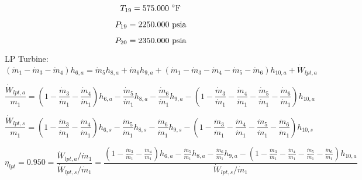 \documentclass{article}
\begin{document}
\begin{equation}
T_{19} =  575.000\textnormal{ \(^{\circ}\)F             }
\end{equation}

\begin{equation}
P_{19} = 2250.000\textnormal{ psia                      }
\end{equation}

\begin{equation}
P_{20} = 2350.000\textnormal{ psia                      }
\end{equation}


LP Turbine:
\begin{equation}
(\dot{m}_{ 1} - \dot{m}_{ 3} - \dot{m}_{ 4})h_{ 6,a} = \dot{m}_{ 5}h_{ 8,a} + \dot{m}_{ 6}h_{ 9,a} + (\dot{m}_{ 1} - \dot{m}_{ 3} - \dot{m}_{ 4} - \dot{m}_{ 5} - \dot{m}_{ 6})h_{10,a} + \dot{W}_{lpt,a}
\end{equation}

\begin{equation}
\frac{\dot{W}_{lpt,a}}{m_1} = (1 - \frac{\dot{m}_{ 3}}{\dot{m}_{ 1}} - \frac{\dot{m}_{ 4}}{\dot{m}_{ 1}})h_{ 6,a} - \frac{\dot{m}_{ 5}}{\dot{m}_{ 1}}h_{ 8,a} - \frac{\dot{m}_{ 6}}{\dot{m}_{ 1}}h_{ 9,a} - (1 - \frac{\dot{m}_{ 3}}{\dot{m}_{ 1}} - \frac{\dot{m}_{ 4}}{\dot{m}_{ 1}} - \frac{\dot{m}_{ 5}}{\dot{m}_{ 1}} - \frac{\dot{m}_{ 6}}{\dot{m}_{ 1}})h_{10,a}\end{equation}

\begin{equation}
\frac{\dot{W}_{lpt,s}}{m_1} = (1 - \frac{\dot{m}_{ 3}}{\dot{m}_{ 1}} - \frac{\dot{m}_{ 4}}{\dot{m}_{ 1}})h_{ 6,s} - \frac{\dot{m}_{ 5}}{\dot{m}_{ 1}}h_{ 8,s} - \frac{\dot{m}_{ 6}}{\dot{m}_{ 1}}h_{ 9,s} - (1 - \frac{\dot{m}_{ 3}}{\dot{m}_{ 1}} - \frac{\dot{m}_{ 4}}{\dot{m}_{ 1}} - \frac{\dot{m}_{ 5}}{\dot{m}_{ 1}} - \frac{\dot{m}_{ 6}}{\dot{m}_{ 1}})h_{10,s}\end{equation}

\begin{equation}
\eta_{lpt} =    0.950 = \frac{\dot{W}_{lpt,a} / \dot{m}_{1}}{\dot{W}_{lpt,s} / \dot{m}_{1}} = \frac{
(1 - \frac{\dot{m}_{ 3}}{\dot{m}_{ 1}} - \frac{\dot{m}_{ 4}}{\dot{m}_{ 1}})h_{ 6,a} - \frac{\dot{m}_{ 5}}{\dot{m}_{ 1}}h_{ 8,a} - \frac{\dot{m}_{ 6}}{\dot{m}_{ 1}}h_{ 9,a} - (1 - \frac{\dot{m}_{ 3}}{\dot{m}_{ 1}} - \frac{\dot{m}_{ 4}}{\dot{m}_{ 1}} - \frac{\dot{m}_{ 5}}{\dot{m}_{ 1}} - \frac{\dot{m}_{ 6}}{\dot{m}_{ 1}})h_{10,a}}{\dot{W}_{lpt,s} / \dot{m}_{1}}
\end{equation}
\end{document}

